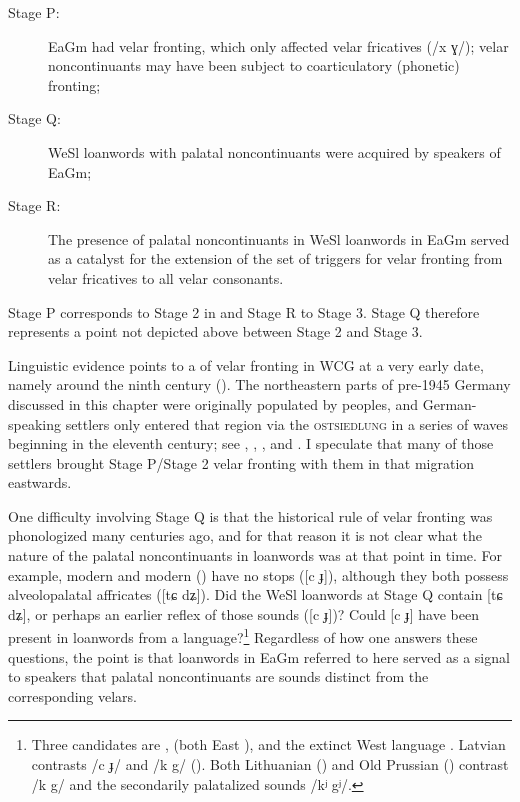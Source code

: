 \begin{description}
\item[Stage P:]   EaGm had velar fronting, which only affected velar fricatives (/x ɣ/); velar noncontinuants may have been subject to coarticulatory (phonetic) fronting;
\item[Stage Q:]   WeSl loanwords with palatal noncontinuants were acquired by speakers of EaGm;
\item[Stage R:]   The presence of palatal noncontinuants in WeSl loanwords in EaGm served as a catalyst for the extension of the set of triggers for velar fronting from velar fricatives to all velar consonants.
\end{description}

Stage P corresponds to Stage 2 in  and Stage R to Stage 3. Stage Q therefore represents a point not depicted above between Stage 2 and Stage 3.

Linguistic evidence points to a  of velar fronting in WCG at a very early date, namely around the ninth century (). The northeastern parts of pre-1945 Germany discussed in this chapter were originally populated by  peoples, and German-speaking settlers only entered that region via the \textsc{ostsiedlung} in a series of waves beginning in the eleventh century; see  \citet[135ff.]{Hirt1925}, \citet[180ff.]{Bach1950}, \citet{Mitzka1959}, and \citet[169ff.]{Bach1970}. I speculate that many of those settlers brought Stage P/Stage 2 velar fronting with them in that migration eastwards.

One difficulty involving Stage Q is that the historical rule of velar fronting was phonologized many centuries ago, and for that reason it is not clear what the nature of the palatal noncontinuants in loanwords was at that point in time. For example, modern  and modern  () have no  stops ([c ɟ]), although they both possess alveolopalatal affricates ([tɕ dʑ]). Did the WeSl loanwords at Stage Q contain [tɕ dʑ], or perhaps an earlier reflex of those sounds ([c ɟ])? Could [c ɟ] have been present in loanwords from a  language?\footnote{Three candidates are ,  (both East ), and  the extinct West  language . Latvian contrasts /c ɟ/ and /k g/ (\citealt{Urek2016}). Both Lithuanian (\citealt{Augustaitis1964}) and Old Prussian (\citealt{Schmalstieg1964}) contrast /k g/ and the secondarily palatalized sounds /kʲ gʲ/.} Regardless of how one answers these questions, the point is that loanwords in EaGm referred to here served as a signal to speakers that palatal noncontinuants are sounds distinct from the corresponding velars.

